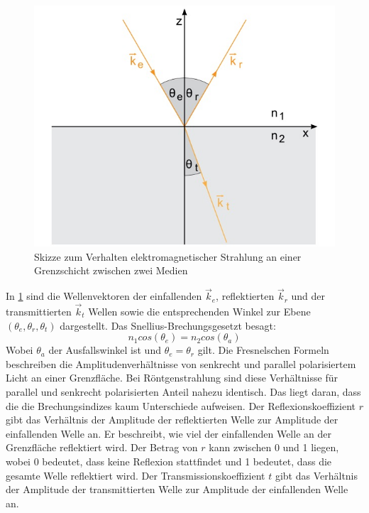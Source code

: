 \begin{figure}
    \includegraphics[width=\textwidth]{bilder/Reflexion.jpg}
    \caption{Skizze zum Verhalten elektromagnetischer Strahlung an einer Grenzschicht zwischen zwei Medien}
    \label{fig:Abbildung 2}
\end{figure}
In \ref{fig:Abbildung 2} sind die Wellenvektoren der einfallenden $\vec{k}_e$, reflektierten $\vec{k}_r$ und der
transmittierten $\vec{k}_t$ Wellen sowie die entsprechenden Winkel zur Ebene $(\theta_e,\theta_r,\theta_t)$ dargestellt.
Das Snellius-Brechungsgesetzt besagt:
\begin{equation}
    n_1cos(\theta_e)=n_2cos(\theta_a)
\end{equation}
Wobei $\theta_a$ der Ausfallswinkel ist und $\theta_e=\theta_r$ gilt.    
Die Fresnelschen Formeln beschreiben die Amplitudenverhältnisse von senkrecht und parallel polarisiertem Licht
an einer Grenzfläche. Bei Röntgenstrahlung sind diese Verhältnisse für parallel und senkrecht polarisierten Anteil nahezu 
identisch. Das liegt daran, dass die die Brechungsindizes kaum Unterschiede aufweisen. 
Der Reflexionskoeffizient \(r\) gibt das Verhältnis der Amplitude der reflektierten Welle zur Amplitude der einfallenden Welle an. 
Er beschreibt, wie viel der einfallenden Welle an der Grenzfläche reflektiert wird. Der Betrag von \(r\) kann zwischen 0 und 1
liegen, wobei 0 bedeutet, dass keine Reflexion stattfindet und 1 bedeutet, dass die gesamte Welle reflektiert wird.
Der Transmissionskoeffizient \(t\) gibt das Verhältnis der Amplitude der transmittierten Welle zur Amplitude der einfallenden Welle an.
